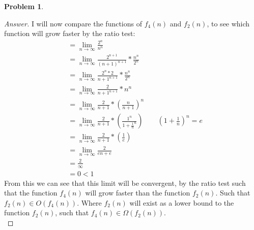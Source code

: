 \documentclass[11pt]{article}
\theoremstyle{definition}
\theoremstyle{definition}
\newtheorem{required}{Problem}
\theoremstyle{definition}
\begin{document}
\begin{required}
\begin{enumerate}[label=(\alph*)]
\begin{proof}[Answer]
I will now compare the functions of $f_4(n)$ and $f_2(n)$, to see which function will grow faster by the ratio test: \\
\begin{align*}
&= \lim_{n \to \infty} \frac{2^{n}}{n^{n}} \\
&= \lim_{n \to \infty} \frac{2^{n+1}}{(n+1)^{n+1}} * \frac{n^{n}}{2^{n}} \\
&= \lim_{n \to \infty} \frac{2^{n} * 2}{n+1^{n+1}} * \frac{n^{n}}{2^{n}} \\
&= \lim_{n \to \infty} \frac{2}{n+1^{n+1}} * n^{n} \\
&= \lim_{n \to \infty} \frac{2}{n+1} * (\frac{n}{n+1})^{n} \\
&= \lim_{n \to \infty} \frac{2}{n+1} * (\frac{1^{n}}{1+\frac{1}{n}^{n}}) \qquad (1+\frac{1}{n})^{n} = e \\
&= \lim_{n \to \infty} \frac{2}{n+1} * (\frac{1}{e}) \\
&= \lim_{n \to \infty} \frac{2}{en+e} \\
&= \frac{2}{\infty} \\
&= 0 < 1
\end{align*}
From this we can see that this limit will be convergent, by the ratio test such that the function $f_4(n)$ will grow faster than the function $f_2(n)$. Such that $f_2(n) \in O(f_4(n))$. Where $f_2(n)$ will exist as a lower bound to the function $f_2(n)$, such that  $f_4(n) \in \Omega(f_2(n))$. \\


\end{proof}
\end{enumerate}
\end{required}
\end{document}
